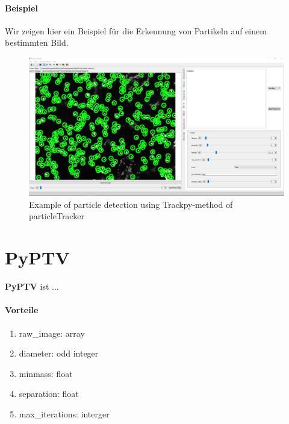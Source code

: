 	\paragraph{Beispiel}
	Wir zeigen hier ein Beispiel für die Erkennung von Partikeln auf einem bestimmten Bild.
	 
	\begin{figure}[H]
    \centering
    \includegraphics[scale=0.3]{Grafiken/particletracker/Using trackpy.png}
    \caption{Example of particle detection using Trackpy-method of particleTracker}
    \label{fig:bild_label}
\end{figure}

\newpage
	
\section{PyPTV}
\textbf{PyPTV} ist ...

	\paragraph{Vorteile}
		\begin{enumerate}
    			\item raw\_image: array \\

    			\item diameter: odd integer \\

    			\item minmass: float \\
    			
    			\item separation: float\\
 			
    			\item max\_iterations: interger\\
    			
		\end{enumerate}
		
